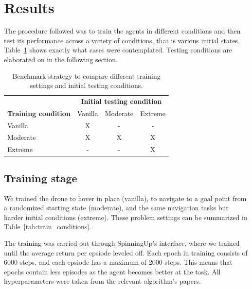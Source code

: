 \section{Results}

The procedure followed was to train the agents in different conditions and then test 
its performance across a variety of conditions, that is various initial states. 
Table~\ref{tab:benchmark_strategy} shows exactly what cases were contemplated. Testing conditions are elaborated on in the following section.

\begin{table}[H]
    \centering
    \caption{Benchmark strategy to compare different training settings and 
    initial testing conditions.}
    \label{tab:benchmark_strategy}
    \begin{tabular}{l | c c c}
        \toprule[0.5pt]
                                    & \multicolumn{3}{c}{\textbf{Initial testing condition}}    \\
        \textbf{Training condition}   & Vanilla     & Moderate      & Extreme                   \\
        \midrule[1pt]
        Vanilla                       & X           &  -            & -                         \\
        Moderate                      & X           &  X            & X                         \\
        Extreme                       & -           &  -            & X                         \\
        \bottomrule[2pt]
    \end{tabular}
\end{table}

\subsection{Training stage}

We trained the drone to hover in place (vanilla), to navigate to a goal point from a randomized starting state (moderate), and the same navigation tasks but harder initial conditions (extreme). These problem settings can be summarized in 
Table~\ref{tab:train_conditions}. 

The training was carried out through SpinningUp's interface, where we trained until the average return per epsiode leveled off. Each epoch in training consists of 6000 steps, and each epsiode has a maximum of 2000 steps. This means that epochs contain less episodes as the agent becomes better at the task. All hyperparameters were taken from the relevant algorithm's papers.

